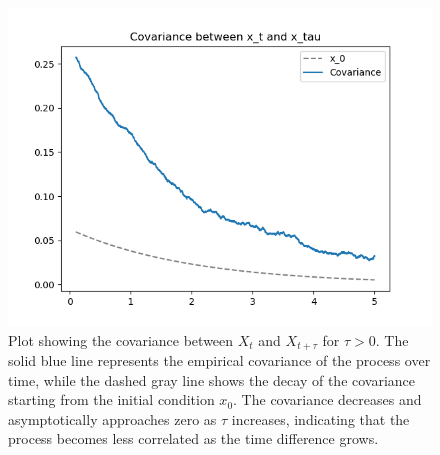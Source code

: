 \documentclass[a4paper,12pt]{article} %
\begin{document}
\begin{figure}[h!]
    \centering
    \includegraphics[width=1\textwidth]{plots/covariance.png} %
    \caption{Plot showing the covariance between \( X_t \) and \( X_{t+\tau} \) for \( \tau > 0 \). The solid blue line represents the empirical covariance of the process over time, while the dashed gray line shows the decay of the covariance starting from the initial condition \( x_0 \). The covariance decreases and asymptotically approaches zero as \( \tau \) increases, indicating that the process becomes less correlated as the time difference grows.}

    \label{fig:covariance}
\end{figure}
\end{document}
